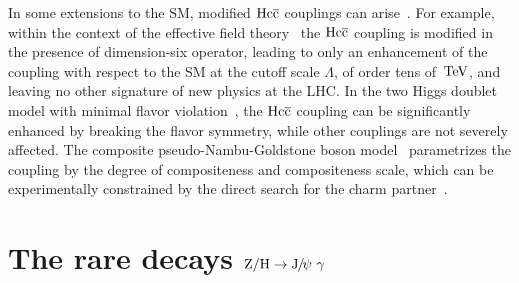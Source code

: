 In some extensions to the SM, modified $\mathrm{H} \mathrm{c}\overline{\mathrm{c}}$ couplings can arise~\cite{Delaunay:2013pja}. 
For example, within the context of the effective field theory~\cite{Buchmuller:1985jz,Weinberg:1980wa,Contino:2013kra} the $\mathrm{H}\mathrm{c}\overline{\mathrm{c}}$ coupling is modified in the presence of dimension-six operator, leading to only an enhancement of the coupling with respect to the SM at the cutoff scale $\Lambda$, of order tens of $\,\text{Te\hspace{-.08em}V}$, and leaving no other signature of new physics at the LHC.
In the two Higgs doublet model with minimal flavor violation~\cite{Trott:2010iz,Jung:2010ik}, the $\mathrm{H} \mathrm{c}\overline{\mathrm{c}}$ coupling can be significantly enhanced by breaking the flavor symmetry, while other couplings are not severely affected. The composite pseudo-Nambu-Goldstone boson model~\cite{Giudice:2007fh} parametrizes the coupling by the degree of compositeness and compositeness scale, which can be experimentally constrained by the direct search for the charm partner~\cite{Delaunay:2013pwa}.

\section{The rare decays $\mathrm{Z}/\mathrm{H}\to{\mathrm{J}\hspace{-.08em}/\hspace{-.14em}\psi}\ \gamma$}
